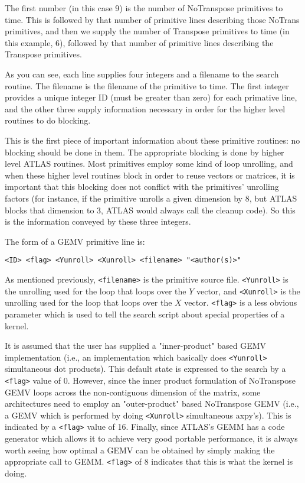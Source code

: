 \documentclass[11pt]{article}
\begin{document}
The first number (in this case 9) is the number of NoTranspose primitives
to time.  This is followed by that number of primitive lines describing those
NoTrans primitives, and then we supply the number of Transpose primitives to
time (in this example, 6), followed by that number of primitive lines
describing the Transpose primitives.

As you can see, each line supplies four integers and a filename to the
search routine.  The filename is the filename of the primitive to time.
The first integer provides a unique integer ID (must be greater than zero)
for each primative line, and the other
three supply information necessary in order for the higher
level routines to do blocking.

This is the first piece of important information about these primitive
routines: no blocking should be done in them.  The appropriate blocking
is done by higher level ATLAS routines.  Most primitives
employ some kind of loop unrolling, and when these higher level routines
block in order to reuse vectors or matrices, it is important that this
blocking does not conflict with the primitives' unrolling factors (for instance,
if the primitive unrolls a given dimension by 8, but ATLAS blocks that
dimension to 3, ATLAS would always call the cleanup code).  So this is the
information conveyed by these three integers.

The form of a GEMV primitive line is:
\begin{verbatim}
<ID> <flag> <Yunroll> <Xunroll> <filename> "<author(s)>"
\end{verbatim}

As mentioned previously, \verb+<filename>+ is the primitive source file.  
\verb+<Yunroll>+
is the unrolling used for the loop that loops over the $Y$ vector, and
\verb+<Xunroll>+ is the unrolling used for the loop that loops over the
$X$ vector.  \verb+<flag>+ is a less obvious parameter which is used
to tell the search script about special properties of a kernel.

It is assumed that the user has supplied a "inner-product" based GEMV
implementation (i.e., an implementation which basically does \verb+<Yunroll>+
simultaneous dot products).  This default state is expressed to the search
by a \verb+<flag>+ value of 0.  However, since the inner product formulation of
NoTranspose GEMV loops across the non-contiguous dimension of the matrix,
some architectures need to employ an "outer-product" based NoTranspose GEMV
(i.e., a GEMV which is performed by doing \verb+<Xunroll>+ simultaneous axpy's).
This is indicated by a \verb+<flag>+ value of 16.  Finally, since ATLAS's
GEMM has
a code generator which allows it to achieve very good portable performance,
it is always worth seeing how optimal a GEMV can be obtained by simply
making the appropriate call to GEMM.  \verb+<flag>+ of 8 indicates
that this is what the kernel is doing.
\end{document}

